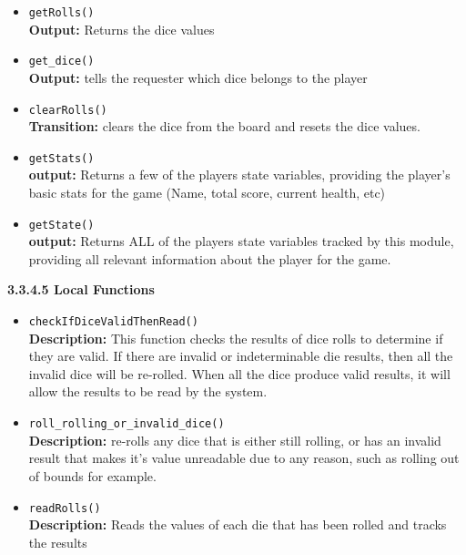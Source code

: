 \documentclass[12pt, titlepage]{article}
\begin{document}
\begin{itemize}
    \item \texttt{getRolls()}\\
    	\textbf{Output:} Returns the dice values 
    
    \item \texttt{get\_dice()}\\
    	\textbf{Output:} tells the requester which dice belongs to the player
    	
    \item \texttt{clearRolls()}\\
    	\textbf{Transition:} clears the dice from the board and resets the dice values.
    	
    \item \texttt{getStats()}\\
    	\textbf{output:} Returns a few of the players state variables, providing the player's basic stats for the game (Name, total score, current health, etc)
    	
    \item \texttt{getState()}\\
    	\textbf{output:} Returns ALL of the players state variables tracked by this module, providing all relevant information about the player for the game.

\end{itemize}

\textbf{3.3.4.5 Local Functions}
\begin{itemize}
    
    \item \texttt{checkIfDiceValidThenRead()}\\
    \textbf{Description:} This function checks the results of dice rolls to determine if they are valid. If there are invalid or indeterminable die results, then all the invalid dice will be re-rolled. When all the dice produce valid results, it will allow the results to be read by the system.
    
    \item \texttt{roll\_rolling\_or\_invalid\_dice()}\\
    	\textbf{Description:} re-rolls any dice that is either still rolling, or has an invalid result that makes it's value unreadable due to any reason, such as rolling out of bounds for example.    
    
    \item \texttt{readRolls()}\\
    \textbf{Description:} Reads the values of each die that has been rolled and tracks the results
    
\end{itemize}
\end{document}
